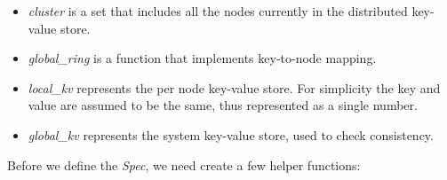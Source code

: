 \begin{itemize}
    \item \textit{cluster} is a set that includes all the nodes currently in the distributed key-value store.
    \item \textit{global\_ring} is a function that implements key-to-node mapping.
    \item \textit{local\_kv} represents the per node key-value store. For
    simplicity the key and value are assumed to be the same, thus represented
    as a single number.
    \item \textit{global\_kv} represents the system key-value store, used to check consistency.
\end{itemize}

Before we define the \textit{Spec}, we need create a few helper functions:\\
